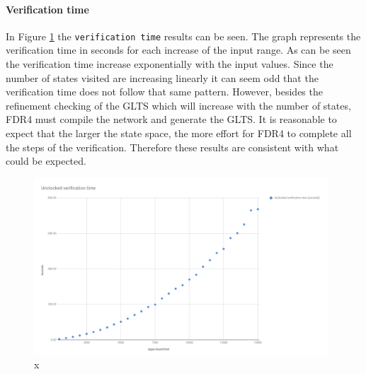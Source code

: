 \paragraph{Verification time}
In Figure \ref{fig:unclocked_verification} the \texttt{verification time} results can be seen. The graph represents the verification time in seconds for each increase of the input range. As can be seen the verification time increase exponentially with the input values. Since the number of states visited are increasing linearly it can seem odd that the verification time does not follow that same pattern. However, besides the refinement checking of the GLTS which will increase with the number of states, FDR4 must compile the network and generate the GLTS. It is reasonable to expect that the larger the state space, the more effort for FDR4 to complete all the steps of the verification. Therefore these results are consistent with what could be expected.
\begin{figure}
    \includegraphics[width=0.98\textwidth]{./figures/15-11-2018/unclocked_verification_time.jpg}
\caption{x}
\label{fig:unclocked_verification}
\end{figure}
